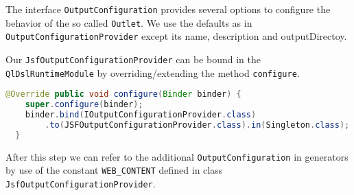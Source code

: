 The interface \texttt{OutputConfiguration} provides several options to configure
the behavior of the so called \texttt{Outlet}. We use the defaults as in
\texttt{OutputConfigurationProvider} except its name, description and outputDirectoy.

Our \texttt{JsfOutputConfigurationProvider} can be bound in the
\texttt{QlDslRuntimeModule} by overriding/extending the method
\texttt{configure}.

\begin{lstlisting}[language=Java]
@Override public void configure(Binder binder) {
    super.configure(binder);
    binder.bind(IOutputConfigurationProvider.class)
        .to(JSFOutputConfigurationProvider.class).in(Singleton.class);
  }
 \end{lstlisting}
 
After this step we can refer to the additional \texttt{OutputConfiguration} in
generators by use of the constant \texttt{WEB\_CONTENT} defined in class
\texttt{JsfOutputConfigurationProvider}.